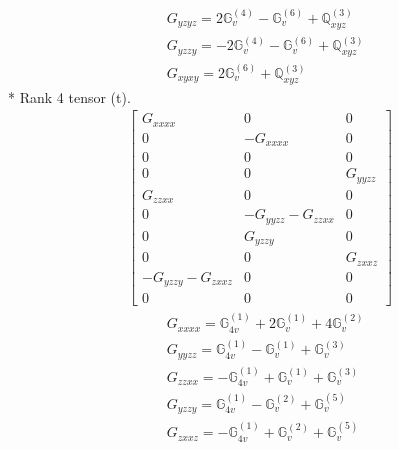 \documentclass[fleqn,8pt,landscape]{jsarticle}
\begin{document}
\begin{align*}
& G_{yzyz} = 2 \mathbb{G}_{v}^{(4)} - \mathbb{G}_{v}^{(6)} + \mathbb{Q}_{xyz}^{(3)} \\
& G_{yzzy} = - 2 \mathbb{G}_{v}^{(4)} - \mathbb{G}_{v}^{(6)} + \mathbb{Q}_{xyz}^{(3)} \\
& G_{xyxy} = 2 \mathbb{G}_{v}^{(6)} + \mathbb{Q}_{xyz}^{(3)}
\end{align*}
* Rank 4 tensor (t).
\begin{align*}
\begin{bmatrix} G_{xxxx} & 0 & 0 \\ 0 & - G_{xxxx} & 0 \\ 0 & 0 & 0 \\ 0 & 0 & G_{yyzz} \\ G_{zzxx} & 0 & 0 \\ 0 & - G_{yyzz} - G_{zzxx} & 0 \\ 0 & G_{yzzy} & 0 \\ 0 & 0 & G_{zxxz} \\ - G_{yzzy} - G_{zxxz} & 0 & 0 \\ 0 & 0 & 0 \end{bmatrix}
\end{align*}
\begin{align*}
& G_{xxxx} = \mathbb{G}_{4v}^{(1)} + 2 \mathbb{G}_{v}^{(1)} + 4 \mathbb{G}_{v}^{(2)} \\
& G_{yyzz} = \mathbb{G}_{4v}^{(1)} - \mathbb{G}_{v}^{(1)} + \mathbb{G}_{v}^{(3)} \\
& G_{zzxx} = - \mathbb{G}_{4v}^{(1)} + \mathbb{G}_{v}^{(1)} + \mathbb{G}_{v}^{(3)} \\
& G_{yzzy} = \mathbb{G}_{4v}^{(1)} - \mathbb{G}_{v}^{(2)} + \mathbb{G}_{v}^{(5)} \\
& G_{zxxz} = - \mathbb{G}_{4v}^{(1)} + \mathbb{G}_{v}^{(2)} + \mathbb{G}_{v}^{(5)}
\end{align*}
\end{document}
